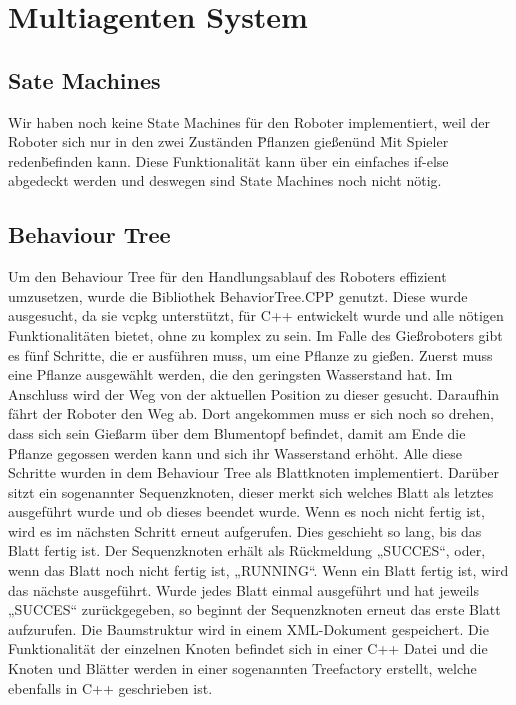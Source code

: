 \section{Multiagenten System}

\subsection{Sate Machines}

Wir haben noch keine State Machines für den Roboter implementiert, weil der Roboter sich nur in den zwei Zuständen \"Pflanzen gießen\" und \"Mit Spieler reden\" befinden kann. Diese Funktionalität kann über ein einfaches if-else abgedeckt werden und deswegen sind State Machines noch nicht nötig.

\subsection{Behaviour Tree}
Um den Behaviour Tree für den Handlungsablauf des Roboters effizient umzusetzen, wurde die Bibliothek BehaviorTree.CPP genutzt. Diese wurde ausgesucht, da sie vcpkg unterstützt, für C++ entwickelt wurde und alle nötigen Funktionalitäten bietet, ohne zu komplex zu sein. 
Im Falle des Gießroboters gibt es fünf Schritte, die er ausführen muss, um eine Pflanze zu gießen. Zuerst muss eine Pflanze ausgewählt werden, die den geringsten Wasserstand hat. Im Anschluss wird der Weg von der aktuellen Position zu dieser gesucht. Daraufhin fährt der Roboter den Weg ab. Dort angekommen muss er sich noch so drehen, dass sich sein Gießarm über dem Blumentopf befindet, damit am Ende die Pflanze gegossen werden kann und sich ihr Wasserstand erhöht. Alle diese Schritte wurden in dem Behaviour Tree als Blattknoten implementiert. Darüber sitzt ein sogenannter Sequenzknoten, dieser merkt sich welches Blatt als letztes ausgeführt wurde und ob dieses beendet wurde. Wenn es noch nicht fertig ist, wird es im nächsten Schritt erneut aufgerufen. Dies geschieht so lang, bis das Blatt fertig ist. Der Sequenzknoten erhält als Rückmeldung „SUCCES“, oder, wenn das Blatt noch nicht fertig ist, „RUNNING“. Wenn ein Blatt fertig ist, wird das nächste ausgeführt. Wurde jedes Blatt einmal ausgeführt und hat jeweils „SUCCES“ zurückgegeben, so beginnt der Sequenzknoten erneut das erste Blatt aufzurufen.
Die Baumstruktur wird in einem XML-Dokument gespeichert. Die Funktionalität der einzelnen Knoten befindet sich in einer C++ Datei und die Knoten und Blätter werden in einer sogenannten Treefactory erstellt, welche ebenfalls in C++ geschrieben ist.
